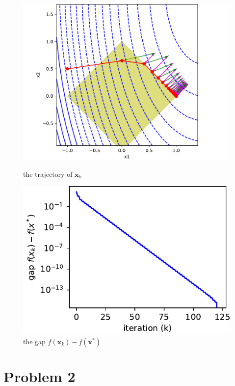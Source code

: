 \documentclass{article}
\def\bx{\boldsymbol{x}}
\begin{document}
\begin{figure}[H]
	\centering
	\begin{minipage}[b]{0.46\linewidth}
		\includegraphics[width=\linewidth]
		{lasso_traces_t1.pdf}
		\caption{the trajectory of $\bx_k$}
	\end{minipage}
	\begin{minipage}[b]{0.46\linewidth}
		\includegraphics[width=\linewidth]
		{lasso_gap_t1.pdf}
		\caption{the gap $f(\bx_k) - f(\bx^*)$}
	\end{minipage}
\end{figure}

\newpage
\section*{Problem 2}
\end{document}
